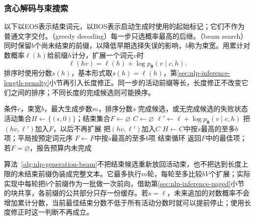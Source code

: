 \subsubsection{贪心解码与束搜索}
\label{sec:nlp-inference-beam-basic}

以下以EOS表示结束词元，以BOS表示启动生成时使用的起始标记；它们不作为普通文字交付。（greedy decoding）每一步只选概率最高的后继。（beam search）同时保留$b$个尚未结束的前缀，以降低早期选择失误的影响，$b$称为束宽。用累计对数概率$\ell(h)$给前缀$h$计分，扩展一个词元$v$时
\begin{equation}
  \ell(hv)=\ell(h)+\log p_{\bm{\theta}}(v\mid c,h).
  \label{eq:nlp-generation-beam-score}
\end{equation}
排序时使用分数$s(h)$，基本形式取$s(h)=\ell(h)$，第\ref{sec:nlp-inference-length-penalty}小节再引入长度修正。同一步的活动前缀等长，长度修正不改变它们之间的排序；不同长度的完成候选则可能换序。

\begin{algorithm}[带独立结束集合的束搜索]
  \label{alg:nlp-generation-beam}
  \begin{algorithmic}[1]
    \Require 条件$c$，束宽$b$，最大生成步数$m$，排序分数$s$
    \Ensure 完成候选，或无完成候选的失败状态
    \State 活动集合$H\gets\{(\epsilon,0)\}$；结束集合$F\gets\varnothing$
      \State $C\gets\varnothing$
        \State $\ell'\gets\ell+\log p_{\bm{\theta}}(v\mid c,h)$
          \State 把$(hv,\ell')$加入$F$，以后不再扩展
          \State 把$(hv,\ell')$加入$C$
        \EndIf
      \EndFor
      \State $H\gets C$中按$s$最高的至多$b$项；平局按预定词元序
      \State $F\gets F$中按$s$最高的至多$b$项
        \State 结束循环
      \EndIf
    \EndFor
    \State 返回$F$中的最佳项；若$F=\varnothing$，报告预算内未完成
  \end{algorithmic}
\end{algorithm}

算法~\ref{alg:nlp-generation-beam}不把结束候选重新放回活动束，也不把达到长度上限的未结束前缀伪装成完整文本。它最多执行$m$轮，每轮至多比较$bV$个扩展；实际实现中每轮把$b$个前缀作为一批做一次前向，借助第\ref{sec:nlp-inference-paged}小节的块共享，各前缀的公共部分只存一份缓存。若$s=\ell$，未来追加的对数概率不会增加累计分数，当前最佳结束分数不低于所有活动分数时就可以提前停止；使用长度修正时这一判断不再成立。

